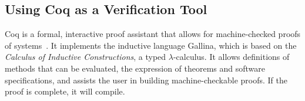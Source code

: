 









\subsection{Using Coq as a Verification Tool}

Coq is a formal, interactive proof assistant that allows for machine-checked proofs of systems~\cite{coqtool}. 
It implements the inductive language Gallina, which is based on the \textit{Calculus of Inductive Constructions}, a typed $\lambda$-calculus. It allows definitions of methods that can be evaluated, the expression of theorems and software specifications, and assists the user in building machine-checkable proofs. If the proof is complete, it will compile.


